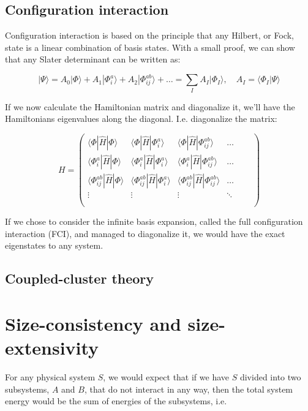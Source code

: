 \documentclass[10pt]{report}
\begin{document}
	
	
	\subsection{Configuration interaction}
	Configuration interaction is based on the principle that any Hilbert, or Fock, state is a linear combination of basis states. With a small proof, we can show that any Slater determinant can be written as:
	
	\begin{equation}
	|\Psi\rangle = A_0|\Phi\rangle + A_1|\Phi_i^a\rangle + A_2|\Phi_{ij}^{ab}\rangle + \ldots = \sum_I A_I|\Phi_I\rangle ,\quad A_I = \langle\Phi_I|\Psi\rangle
	\end{equation}
	
	If we now calculate the Hamiltonian matrix and diagonalize it, we'll have the Hamiltonians eigenvalues along the diagonal. I.e. diagonalize the matrix:
	
	\begin{equation}
	H = \begin{pmatrix}
	\langle\Phi|\hat{H}|\Phi\rangle & \langle\Phi|\hat{H}|\Phi_i^a\rangle & \langle\Phi|\hat{H}|\Phi_{ij}^{ab}\rangle & \ldots\\
	\langle\Phi_i^a|\hat{H}|\Phi\rangle & \langle\Phi_i^a|\hat{H}|\Phi_i^a\rangle & \langle\Phi_i^a|\hat{H}|\Phi_{ij}^{ab}\rangle & \ldots\\
	\langle\Phi_{ij}^{ab}|\hat{H}|\Phi\rangle & \langle\Phi_{ij}^{ab}|\hat{H}|\Phi_i^a\rangle & \langle\Phi_{ij}^{ab}|\hat{H}|\Phi_{ij}^{ab}\rangle & \ldots & \quad\\
	\vdots & \vdots & \vdots & \ddots\\
	\\
	\end{pmatrix}
	\end{equation}
	
	If we chose to consider the infinite basis expansion, called the full configuration interaction (FCI), and managed to diagonalize it, we would have the exact eigenstates to any system.
	
	\subsection{Coupled-cluster theory}
	
	\section{Size-consistency and size-extensivity}
	For any physical system $S$, we would expect that if we have $S$ divided into two subsystems, $A$ and $B$, that do not interact in any way, then the total system energy would be the sum of energies of the subsystems, i.e.
	
\end{document}
